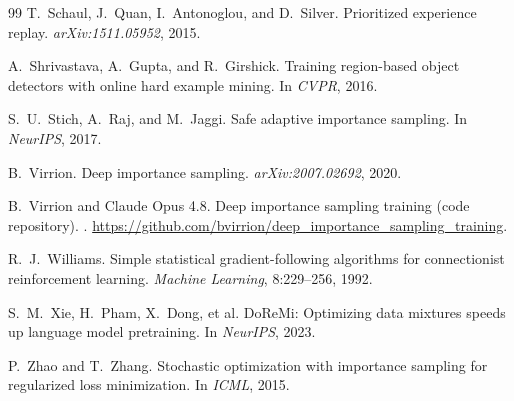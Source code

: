\documentclass[11pt]{article}
\begin{document}
\begin{thebibliography}{99}
T.~Schaul, J.~Quan, I.~Antonoglou, and D.~Silver.
\newblock Prioritized experience replay.
\newblock \emph{arXiv:1511.05952}, 2015.

A.~Shrivastava, A.~Gupta, and R.~Girshick.
\newblock Training region-based object detectors with online hard example
mining.
\newblock In \emph{CVPR}, 2016.

S.~U.~Stich, A.~Raj, and M.~Jaggi.
\newblock Safe adaptive importance sampling.
\newblock In \emph{NeurIPS}, 2017.

B.~Virrion.
\newblock Deep importance sampling.
\newblock \emph{arXiv:2007.02692}, 2020.

B.~Virrion and Claude Opus 4.8.
\newblock Deep importance sampling training (code repository).
.
\newblock \url{https://github.com/bvirrion/deep_importance_sampling_training}.

R.~J.~Williams.
\newblock Simple statistical gradient-following algorithms for connectionist
reinforcement learning.
\newblock \emph{Machine Learning}, 8:229--256, 1992.

S.~M.~Xie, H.~Pham, X.~Dong, et al.
\newblock DoReMi: Optimizing data mixtures speeds up language model pretraining.
\newblock In \emph{NeurIPS}, 2023.

P.~Zhao and T.~Zhang.
\newblock Stochastic optimization with importance sampling for regularized loss
minimization.
\newblock In \emph{ICML}, 2015.

\end{thebibliography}
\end{document}
